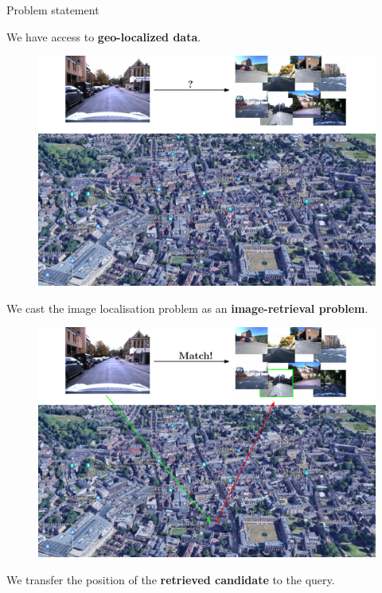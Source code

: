 \begin{frame}{Problem statement}
{\begin{minipage}{0.75\linewidth}
\begin{figure}
		\end{figure}		
	\end{minipage}
	\hfill
	\begin{minipage}{0.18\linewidth}
			We have access to \textbf{geo-localized data}.
	\end{minipage}
	}
	{
	\begin{minipage}{0.75\linewidth}
		\begin{figure}
			\includegraphics[width=\linewidth]{vect/intro/fig1/3}
		\end{figure}		
	\end{minipage}
	\hfill
	\begin{minipage}{0.18\linewidth}
		We cast the image localisation problem as an \textbf{image-retrieval problem}.
	\end{minipage}
	}
	{
	\begin{minipage}{0.75\linewidth}
		\begin{figure}
			\includegraphics[width=\linewidth]{vect/intro/fig1/4}
		\end{figure}		
	\end{minipage}
	\hfill
	\begin{minipage}{0.18\linewidth}
		We transfer the position of the \textbf{retrieved candidate} to the query.
	\end{minipage}
	}
\end{frame}

